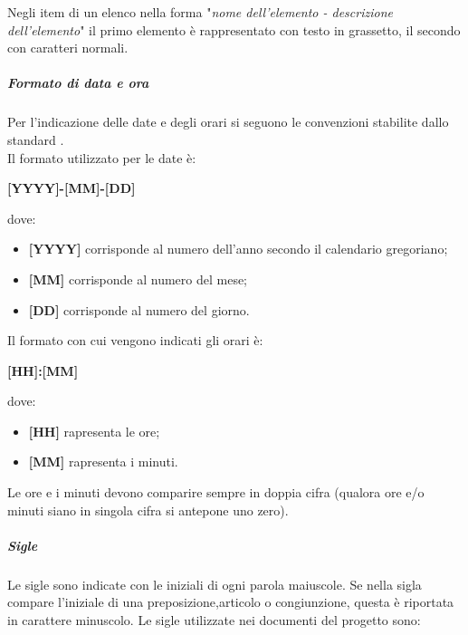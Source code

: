 Negli item di un elenco nella forma "\textit{nome dell'elemento - descrizione dell'elemento}"  il primo elemento è rappresentato con testo in grassetto, il secondo con caratteri normali.
\subparagraph{Formato di data e ora}
Per l'indicazione delle date e degli orari si seguono le convenzioni stabilite dallo standard . \\
Il formato utilizzato per le date è:
\begin{center}
    \textbf{[YYYY]-[MM]-[DD]}
\end{center}
    dove:
    \begin{itemize}
        \item \textbf{[YYYY]} corrisponde al numero dell'anno secondo il calendario gregoriano;
        \item \textbf{[MM]} corrisponde al numero del mese;
        \item \textbf{[DD]} corrisponde al numero del giorno.
    \end{itemize}
Il formato con cui vengono indicati gli orari è:
\begin{center}
    \textbf{[HH]:[MM]}
\end{center} 
dove:
\begin{itemize}
    \item \textbf{[HH]} rapresenta le ore;
    \item \textbf{[MM]} rapresenta i minuti.
\end{itemize}
Le ore e i minuti devono comparire sempre in doppia cifra (qualora ore e/o minuti siano in singola cifra si antepone uno zero). 
\subparagraph{Sigle}
Le sigle sono indicate con le iniziali di ogni parola maiuscole. Se nella sigla compare l'iniziale di una preposizione,articolo o congiunzione, questa è riportata in carattere minuscolo.
Le sigle utilizzate nei documenti del progetto sono:
